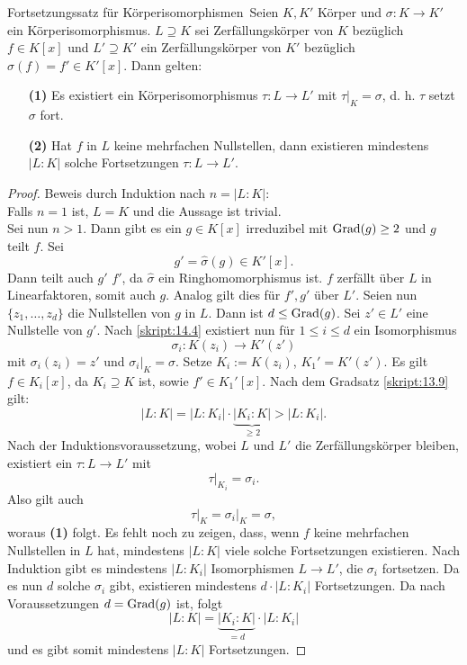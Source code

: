 \begin{genericdf}{Fortsetzungssatz für Körperisomorphismen}\label{skript:14.6}\
	Seien $K,K'$ Körper und $\sigma: K \to K'$ ein Körperisomorphismus. $L\supseteq K$ sei Zerfällungskörper von $K$ bezüglich $f \in K[x]$ und $L'\supseteq K'$ ein Zerfällungskörper von $K'$ bezüglich $\hat{\sigma}(f)=f' \in K'[x]$. Dann gelten:
	\begin{itemize}
		\item[\textbf{(1)}]
		Es existiert ein Körperisomorphismus $\tau: L\to L'$ mit $\tau\big|_K=\sigma$, d. h. $\tau$ setzt $\sigma$ fort.
		\item[\textbf{(2)}]
		Hat $f$ in $L$ keine mehrfachen Nullstellen, dann existieren mindestens $|L:K|$ solche Fortsetzungen $\tau: L\to L'$.
	\end{itemize}
\end{genericdf}
\begin{proof}
Beweis durch Induktion nach $n=|L:K|$:\\
Falls $n=1$ ist, $L=K$ und die Aussage ist trivial.\\
Sei nun $n>1$. Dann gibt es ein $g \in K[x]$ irreduzibel mit $\operatorname{Grad}(g) \geq 2 $ und $g$ teilt $f$. Sei
\[g' = \hat{\sigma} (g) \in K'[x].\]
Dann teilt auch $g'$ $f'$, da $\hat{\sigma}$ ein Ringhomomorphismus ist. $f$ zerfällt über $L$ in Linearfaktoren, somit auch $g$. Analog gilt dies für $f',g'$ über $L'$. Seien nun $\{z_1,\ldots,z_d\}$ die Nullstellen von $g$ in $L$. Dann ist $d \leq \operatorname{Grad}(g)$. Sei $z' \in L'$ eine Nullstelle von $g'$. Nach \ref{skript:14.4} existiert nun für $1 \leq i \leq d$ ein Isomorphismus
\[\sigma_i : K(z_i) \to K'(z')\]
mit $\sigma_i (z_i) =z'$ und $\sigma_i\big|_K=\sigma$. Setze $K_i:=K(z_i)$, $K_1'=K'(z')$. Es gilt $f \in K_i[x]$, da $K_i\supseteq K$ ist, sowie $f' \in K_1'[x]$. Nach dem Gradsatz \ref{skript:13.9} gilt:
\[|L:K|= |L:K_i|\cdot\underbrace{|K_i:K|}_{\geq2} > |L:K_i|.\]
Nach der Induktionsvoraussetzung, wobei $L$ und $L'$ die Zerfällungskörper bleiben, existiert ein $\tau: L\to L'$ mit
\[\tau\big|_{K_i}=\sigma_i.\]
Also gilt auch
\[\tau\big|_K=\sigma_i\big|_K=\sigma,\]
woraus \textbf{(1)} folgt.
Es fehlt noch zu zeigen, dass, wenn $f$ keine mehrfachen Nullstellen in $L$ hat, mindestens $|L:K|$ viele solche Fortsetzungen existieren. Nach Induktion gibt es mindestens $|L:K_i|$ Isomorphismen $L\to L'$, die $\sigma_i$ fortsetzen. Da es nun $d$ solche $\sigma_i$ gibt, existieren mindestens $d\cdot|L:K_i|$ Fortsetzungen.
Da nach Voraussetzungen $d = \operatorname{Grad} (g)$ ist, folgt
\[|L:K|=\underbrace{|K_i:K|}_{=d}\cdot|L:K_i|\]
und es gibt somit mindestens $|L:K|$ Fortsetzungen.
\end{proof}

